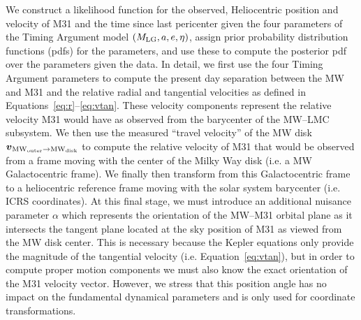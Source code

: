\documentclass[twocolumn]{aastex631}
\newcommand{\mlg}{\ensuremath{M_{\rm LG}}}
\newcommand{\bov}{\ensuremath{\boldsymbol{v}}}
\newcommand{\vel}[2]{\ensuremath{\bov_{\rm #1 \to #2}}}
\newcommand{\mwouter}{\ensuremath{\textrm{MW}_\textrm{outer}}}
\newcommand{\mwdisk}{\ensuremath{\textrm{MW}_\textrm{disk}}}
\begin{document}
We construct a likelihood function for the observed, Heliocentric position and
velocity of M31 and the time since last pericenter given the four parameters of
the Timing Argument model $(\mlg, a, e, \eta)$, assign prior probability
distribution functions (pdfs) for the parameters, and use these to compute the
posterior pdf over the parameters given the data.
In detail, we first use the four Timing Argument parameters to compute the
present day separation between the MW and M31 and the relative radial and
tangential velocities as defined in Equations~\ref{eq:r}--\ref{eq:vtan}.
These velocity components represent the relative velocity M31 would have as
observed from the barycenter of the MW--LMC subsystem.
We then use the measured ``travel velocity'' of the MW disk
$\vel{\mwouter}{\mwdisk}$ to compute the relative velocity of M31 that would be
observed from a frame moving with the center of the Milky Way disk (i.e. a
MW Galactocentric frame).
We finally then transform from this Galactocentric frame to a heliocentric
reference frame moving with the solar system barycenter (i.e. ICRS coordinates).
At this final stage, we must introduce an additional nuisance parameter $\alpha$
which represents the orientation of the MW--M31 orbital plane as it intersects
the tangent plane located at the sky position of M31 as viewed from the MW disk
center.
This is necessary because the Kepler equations only provide the magnitude of the
tangential velocity (i.e. Equation~\ref{eq:vtan}), but in order to compute
proper motion components we must also know the exact orientation of the M31
velocity vector.
However, we stress that this position angle has no impact on the fundamental
dynamical parameters and is only used for coordinate transformations.
\end{document}
